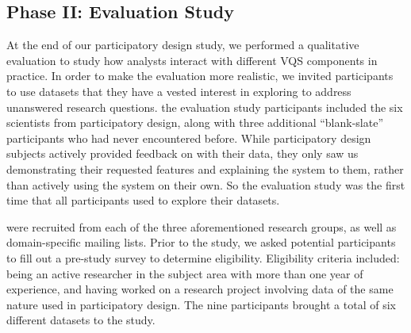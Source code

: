 \subsection{Phase II: Evaluation Study}
At the end of our participatory design study, we performed a qualitative evaluation to study how analysts interact with different VQS components in practice. In order to make the evaluation more realistic, we invited participants to use datasets that they have a vested interest in exploring to address unanswered research questions.  the evaluation study participants included the six scientists from participatory design, along with three additional ``blank-slate'' participants who had never encountered \zvpp before. While participatory design subjects actively provided feedback on \zvpp with their data, they only saw us demonstrating their requested features and explaining the system to them, rather than actively using the system on their own. So the evaluation study was the first time that all participants used \zvpp to explore their datasets.
\par {} were recruited from each of the three aforementioned research groups, as well as domain-specific mailing lists. Prior to the study, we asked potential participants to fill out a pre-study survey to determine eligibility. Eligibility criteria included: being an active researcher in the subject area with more than one year of experience, and having worked on a research project involving data of the same nature used in participatory design. The nine participants brought a total of six different datasets to the study.  
